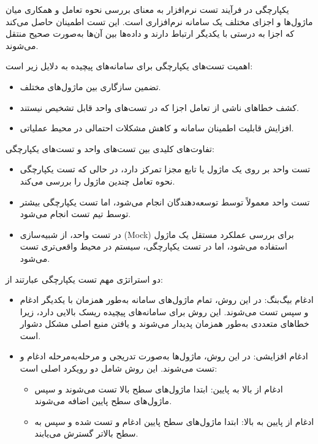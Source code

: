 یکپارچگی در فرآیند تست نرم‌افزار به معنای بررسی نحوه تعامل و همکاری میان ماژول‌ها و اجزای مختلف یک سامانه نرم‌افزاری است. این تست اطمینان حاصل می‌کند که اجزا به درستی با یکدیگر ارتباط دارند و داده‌ها بین آن‌ها به‌صورت صحیح منتقل می‌شوند. 

اهمیت تست‌های یکپارچگی برای سامانه‌های پیچیده به دلایل زیر است:
\begin{itemize}
    \item تضمین سازگاری بین ماژول‌های مختلف.
    \item کشف خطاهای ناشی از تعامل اجزا که در تست‌های واحد قابل تشخیص نیستند.
    \item افزایش قابلیت اطمینان سامانه و کاهش مشکلات احتمالی در محیط عملیاتی.
\end{itemize}

تفاوت‌های کلیدی بین تست‌های واحد و تست‌های یکپارچگی:
\begin{itemize}
    \item تست واحد بر روی یک ماژول یا تابع مجزا تمرکز دارد، در حالی که تست یکپارچگی نحوه تعامل چندین ماژول را بررسی می‌کند.
    \item تست واحد معمولاً توسط توسعه‌دهندگان انجام می‌شود، اما تست یکپارچگی بیشتر توسط تیم تست انجام می‌شود.
    \item در تست واحد، از شبیه‌سازی (Mock) برای بررسی عملکرد مستقل یک ماژول استفاده می‌شود، اما در تست یکپارچگی، سیستم در محیط واقعی‌تری تست می‌شود.
\end{itemize}

دو استراتژی مهم تست یکپارچگی عبارتند از:
\begin{itemize}
    \item {ادغام بیگ‌بنگ}: در این روش، تمام ماژول‌های سامانه به‌طور همزمان با یکدیگر ادغام و سپس تست می‌شوند. این روش برای سامانه‌های پیچیده ریسک بالایی دارد، زیرا خطاهای متعددی به‌طور همزمان پدیدار می‌شوند و یافتن منبع اصلی مشکل دشوار است.
    \item {ادغام افزایشی}: در این روش، ماژول‌ها به‌صورت تدریجی و مرحله‌به‌مرحله ادغام و تست می‌شوند. این روش شامل دو رویکرد اصلی است:
    \begin{itemize}
        \item {ادغام از بالا به پایین}: ابتدا ماژول‌های سطح بالا تست می‌شوند و سپس ماژول‌های سطح پایین اضافه می‌شوند.
        \item {ادغام از پایین به بالا}: ابتدا ماژول‌های سطح پایین ادغام و تست شده و سپس به سطح بالاتر گسترش می‌یابند.
    \end{itemize}
\end{itemize}

